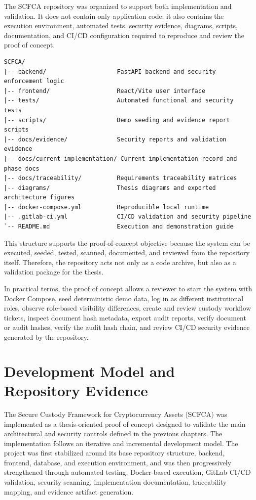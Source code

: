 \documentclass[12pt,a4paper]{report}
\begin{document}
The SCFCA repository was organized to support both implementation and validation. It does not contain only application code; it also contains the execution environment, automated tests, security evidence, diagrams, scripts, documentation, and CI/CD configuration required to reproduce and review the proof of concept.

\begin{verbatim}
SCFCA/
|-- backend/                    FastAPI backend and security enforcement logic
|-- frontend/                   React/Vite user interface
|-- tests/                      Automated functional and security tests
|-- scripts/                    Demo seeding and evidence report scripts
|-- docs/evidence/              Security reports and validation evidence
|-- docs/current-implementation/ Current implementation record and phase docs
|-- docs/traceability/          Requirements traceability matrices
|-- diagrams/                   Thesis diagrams and exported architecture figures
|-- docker-compose.yml          Reproducible local runtime
|-- .gitlab-ci.yml              CI/CD validation and security pipeline
`-- README.md                   Execution and demonstration guide
\end{verbatim}

This structure supports the proof-of-concept objective because the system can be executed, seeded, tested, scanned, documented, and reviewed from the repository itself. Therefore, the repository acts not only as a code archive, but also as a validation package for the thesis.\cite{REPO1} \cite{REPO2}

In practical terms, the proof of concept allows a reviewer to start the system with Docker Compose, seed deterministic demo data, log in as different institutional roles, observe role-based visibility differences, create and review custody workflow tickets, inspect document hash metadata, export audit reports, verify document or audit hashes, verify the audit hash chain, and review CI/CD security evidence generated by the repository.

\section{Development Model and Repository Evidence}
\label{sec:development-model-repository-evidence}

The Secure Custody Framework for Cryptocurrency Assets (SCFCA) was implemented as a thesis-oriented proof of concept designed to validate the main architectural and security controls defined in the previous chapters. The implementation follows an iterative and incremental development model. The project was first stabilized around its base repository structure, backend, frontend, database, and execution environment, and was then progressively strengthened through automated testing, Docker-based execution, GitLab CI/CD validation, security scanning, implementation documentation, traceability mapping, and evidence artifact generation.
\end{document}
